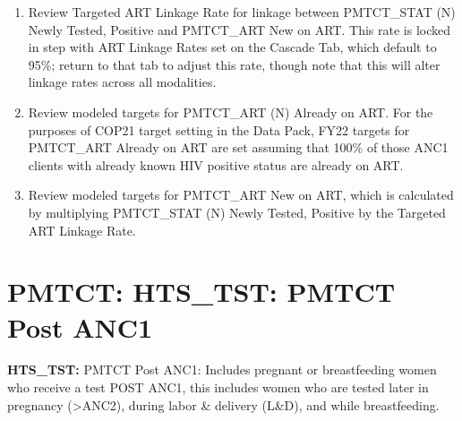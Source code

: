 \documentclass[
  openany]{book}
\begin{document}
\begin{enumerate}
\def\labelenumi{\arabic{enumi}.}
\item
  Review Targeted ART Linkage Rate for linkage between PMTCT\_STAT (N)
  Newly Tested, Positive and PMTCT\_ART New on ART. This rate is locked
  in step with ART Linkage Rates set on the Cascade Tab, which default
  to 95\%; return to that tab to adjust this rate, though note that
  this will alter linkage rates across all modalities.
\item
  Review modeled targets for PMTCT\_ART (N) Already on ART. For the
  purposes of COP21 target setting in the Data Pack, FY22 targets for
  PMTCT\_ART Already on ART are set assuming that 100\% of those ANC1
  clients with already known HIV positive status are already on ART.
\item
  Review modeled targets for PMTCT\_ART New on ART, which is calculated
  by multiplying PMTCT\_STAT (N) Newly Tested, Positive by the Targeted
  ART Linkage Rate.
\end{enumerate}

\textbf{\hfill\break
}

\hypertarget{pmtct-hts_tst-pmtct-post-anc1}{%
\section{PMTCT: HTS\_TST: PMTCT Post ANC1}\label{pmtct-hts_tst-pmtct-post-anc1}}

\textbf{HTS\_TST:} PMTCT Post ANC1: Includes pregnant or breastfeeding women
who receive a test POST ANC1, this includes women who are tested later
in pregnancy (\textgreater ANC2), during labor \& delivery (L\&D), and while
breastfeeding.
\end{document}
